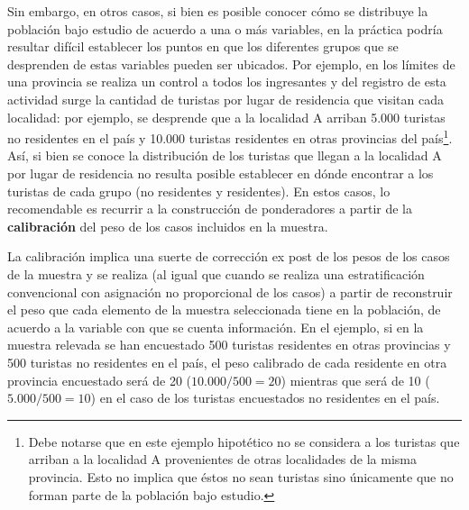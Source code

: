 \documentclass[
]{book}
\begin{document}
Sin embargo, en otros casos, si bien es posible conocer cómo se distribuye la población bajo estudio de acuerdo a una o más variables, en la práctica podría resultar difícil establecer los puntos en que los diferentes grupos que se desprenden de estas variables pueden ser ubicados. Por ejemplo, en los límites de una provincia se realiza un control a todos los ingresantes y del registro de esta actividad surge la cantidad de turistas por lugar de residencia que visitan cada localidad: por ejemplo, se desprende que a la localidad A arriban 5.000 turistas no residentes en el país y 10.000 turistas residentes en otras provincias del país\footnote{Debe notarse que en este ejemplo hipotético no se considera a los turistas que arriban a la localidad A provenientes de otras localidades de la misma provincia. Esto no implica que éstos no sean turistas sino únicamente que no forman parte de la población bajo estudio.}. Así, si bien se conoce la distribución de los turistas que llegan a la localidad A por lugar de residencia no resulta posible establecer en dónde encontrar a los turistas de cada grupo (no residentes y residentes). En estos casos, lo recomendable es recurrir a la construcción de ponderadores a partir de la \textbf{calibración} del peso de los casos incluidos en la muestra.

La calibración implica una suerte de corrección ex post de los pesos de los casos de la muestra y se realiza (al igual que cuando se realiza una estratificación convencional con asignación no proporcional de los casos) a partir de reconstruir el peso que cada elemento de la muestra seleccionada tiene en la población, de acuerdo a la variable con que se cuenta información. En el ejemplo, si en la muestra relevada se han encuestado 500 turistas residentes en otras provincias y 500 turistas no residentes en el país, el peso calibrado de cada residente en otra provincia encuestado será de 20 (\(10.000/500=20\)) mientras que será de 10 (\(5.000/500=10\)) en el caso de los turistas encuestados no residentes en el país.
\end{document}
